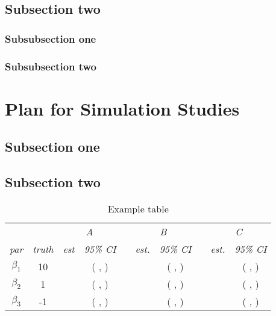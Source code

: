 \documentclass[12pt]{article}
\begin{document}
\subsection{Subsection two}\label{sec:subsec2}


\subsubsection{Subsubsection one}\label{sec:subsub2-1}



\subsubsection{Subsubsection two}\label{sec:subsub2-2}


\newpage
\section{Plan for Simulation Studies}\label{sec:simulation}



\subsection{Subsection one}\label{sec:subsimulation1}


\subsection{Subsection two}\label{sec:subsimulation2}

\begin{table}[H]
\begin{center}
\caption{Example table}
\begin{tabular}{cccccccccc}
\hline
&  & \multicolumn{2}{c}{\emph{A}} && \multicolumn{2}{c}{\emph{B}} & &\multicolumn{2}{c}{\emph{C}} \\
\cline{3-4}\cline{6-7}\cline{9-10}
\emph{par}& \emph{truth}& \emph{est}    & \emph{95\% CI} & & \emph{est.}    & \emph{95\% CI}  && \emph{est.} & \emph{95\% CI}\\
\hline
$\beta_1$ & 10 &   &( , )& &  & ( , )& &  &( , )\\
$\beta_2$ & 1 & &( ,  ) & &  & ( , )& &  &( , )\\
$\beta_3$ & -1 &  &( ,  ) & &  & ( , )& & &( , )\\
\hline
\end{tabular}
\end{center}
\end{table}
\end{document}
